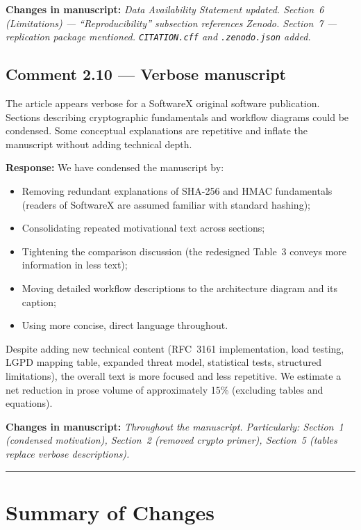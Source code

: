 \documentclass[11pt,a4paper]{article}
\newcommand{\response}[1]{\par\noindent\textcolor{responsecolor}{\textbf{Response:}} #1}
\newcommand{\change}[1]{\par\noindent\textcolor{changecolor}{\textbf{Changes in manuscript:}} \textit{#1}}
\begin{document}
\change{Data Availability Statement updated. Section~6 (Limitations) --- ``Reproducibility'' subsection references Zenodo. Section~7 --- replication package mentioned. \texttt{CITATION.cff} and \texttt{.zenodo.json} added.}

\bigskip

\subsection*{Comment 2.10 --- Verbose manuscript}

\begin{reviewerbox}
The article appears verbose for a SoftwareX original software publication. Sections describing cryptographic fundamentals and workflow diagrams could be condensed. Some conceptual explanations are repetitive and inflate the manuscript without adding technical depth.
\end{reviewerbox}

\response{We have condensed the manuscript by:}

\begin{itemize}[nosep]
  \item Removing redundant explanations of SHA-256 and HMAC fundamentals (readers of SoftwareX are assumed familiar with standard hashing);
  \item Consolidating repeated motivational text across sections;
  \item Tightening the comparison discussion (the redesigned Table~3 conveys more information in less text);
  \item Moving detailed workflow descriptions to the architecture diagram and its caption;
  \item Using more concise, direct language throughout.
\end{itemize}

\noindent Despite adding new technical content (RFC~3161 implementation, load testing, LGPD mapping table, expanded threat model, statistical tests, structured limitations), the overall text is more focused and less repetitive. We estimate a net reduction in prose volume of approximately 15\% (excluding tables and equations).

\change{Throughout the manuscript. Particularly: Section~1 (condensed motivation), Section~2 (removed crypto primer), Section~5 (tables replace verbose descriptions).}

\bigskip
\hrule
\bigskip

\section*{Summary of Changes}
\end{document}
